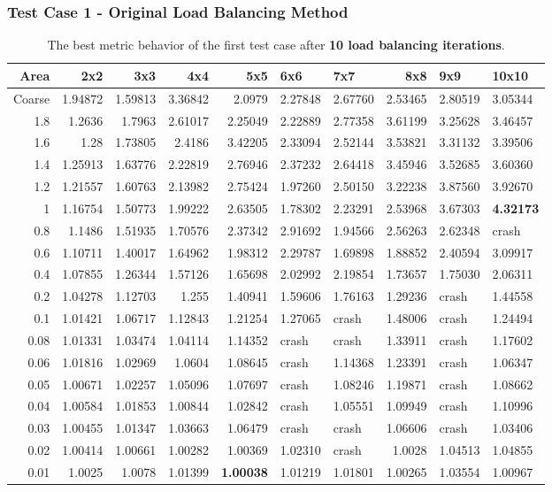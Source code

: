 \documentclass[compress]{beamer}
\begin{document}
\begin{frame}[t]\frametitle{Test Case 1 - Original Load Balancing Method}
\begin{table}[H]
\tiny
\centering
\caption{The best metric behavior of the first test case after \textbf{10 load balancing iterations}.} 
\begin{tabular}{rrrrrllrll}
\hline
 Area & 2x2 &3x3 & 4x4 & 5x5 & 6x6 & 7x7 &8x8 & 9x9 & 10x10 \\ 
\hline
 Coarse   & 1.94872 & 1.59813 & 3.36842 & 2.0979  & 2.27848 & 2.67760 & 2.53465 & 2.80519 & 3.05344 \\
  1.8  & 1.2636  & 1.7963  & 2.61017 & 2.25049 & 2.22889 & 2.77358 & 3.61199 & 3.25628 & 3.46457 \\
  1.6  & 1.28    & 1.73805 & 2.4186  & 3.42205 & 2.33094 & 2.52144 & 3.53821 & 3.31132 & 3.39506 \\
  1.4  & 1.25913 & 1.63776 & 2.22819 & 2.76946 & 2.37232 & 2.64418 & 3.45946 & 3.52685 & 3.60360 \\
  1.2  & 1.21557 & 1.60763 & 2.13982 & 2.75424 & 1.97260 & 2.50150 & 3.22238 & 3.87560 & 3.92670 \\
  1    & 1.16754 & 1.50773 & 1.99222 & 2.63505 & 1.78302 & 2.23291 & 2.53968 & 3.67303 & \textbf{\cellcolor{blue!25}4.32173} \\
  0.8  & 1.1486  & 1.51935 & 1.70576 & 2.37342 & 2.91692 & 1.94566 & 2.56263 & 2.62348 & crash   \\
  0.6  & 1.10711 & 1.40017 & 1.64962 & 1.98312 & 2.29787 & 1.69898 & 1.88852 & 2.40594 & 3.09917 \\
  0.4  & 1.07855 & 1.26344 & 1.57126 & 1.65698 & 2.02992 & 2.19854 & 1.73657 & 1.75030 & 2.06311 \\
  0.2  & 1.04278 & 1.12703 & 1.255   & 1.40941 & 1.59606 & 1.76163 & 1.29236 & crash   & 1.44558 \\
  0.1  & 1.01421 & 1.06717 & 1.12843 & 1.21254 & 1.27065 & crash   & 1.48006 & crash   & 1.24494 \\
  0.08 & 1.01331 & 1.03474 & 1.04114 & 1.14352 & crash   & crash   & 1.33911 & crash   & 1.17602 \\
  0.06 & 1.01816 & 1.02969 & 1.0604  & 1.08645 & crash   & 1.14368 & 1.23391 & crash   & 1.06347 \\
  0.05 & 1.00671 & 1.02257 & 1.05096 & 1.07697 & crash   & 1.08246 & 1.19871 & crash   & 1.08662 \\
  0.04 & 1.00584 & 1.01853 & 1.00844 & 1.02842 & crash   & 1.05551 & 1.09949 & crash   & 1.10996 \\
  0.03 & 1.00455 & 1.01347 & 1.03663 & 1.06479 & crash   & crash   & 1.06606 & crash   & 1.03406 \\
  0.02 & 1.00414 & 1.00661 & 1.00282 & 1.00369 & 1.02310 & crash   & 1.0028  & 1.04513 & 1.04855 \\
  0.01 & 1.0025  & 1.0078  & 1.01399 & \textbf{\cellcolor{blue!25}1.00038} & 1.01219 & 1.01801 & 1.00265 & 1.03554 & 1.00967 \\
\hline
\end{tabular}
\end{table}
\end{frame}
\end{document}
